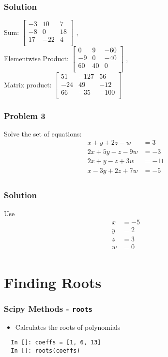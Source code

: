 \documentclass[14pt,compress]{beamer}
\newcounter{time}
\newcommand{\inctime}[1]{\addtocounter{time}{#1}{\tiny \thetime\ m}}
\newcommand{\typ}[1]{\lstinline{#1}}
\newcommand{\kwrd}[1]{ \texttt{\textbf{\color{blue}{#1}}}  }
\begin{document}
\begin{frame}[fragile]
\frametitle{Solution}
Sum: 
$\begin{bmatrix}
-3 & 10 & 7 \\
-8 & 0 & 18 \\
17 & -22 & 4 \\
\end{bmatrix}$
,\\ Elementwise Product:
$\begin{bmatrix}
0 & 9 & -60 \\
-9 & 0 & -40 \\
60 & 40 & 0 \\
\end{bmatrix}$
,\\ Matrix product:
$\begin{bmatrix}
51 & -127 & 56 \\
-24 & 49 & -12 \\
66 & -35 & -100 \\
\end{bmatrix}$
\end{frame}

\begin{frame}[fragile]
\frametitle{Problem 3}
Solve the set of equations:
\begin{align*}
  x + y + 2z -w & = 3\\
  2x + 5y - z - 9w & = -3\\
  2x + y -z + 3w & = -11 \\
  x - 3y + 2z + 7w & = -5\\
\end{align*}
\inctime{10}
\end{frame}

\begin{frame}[fragile]
\frametitle{Solution}
Use \kwrd{solve()}
\begin{align*}
  x & = -5\\
  y & = 2\\
  z & = 3\\
  w & = 0\\
\end{align*}
\end{frame}

\section{Finding Roots}

\begin{frame}[fragile]
\frametitle{Scipy Methods - \typ{roots}}
\begin{itemize}
\item Calculates the roots of polynomials
\end{itemize}
\begin{lstlisting}
  In []: coeffs = [1, 6, 13]
  In []: roots(coeffs)
\end{lstlisting}
\end{frame}
\end{document}
